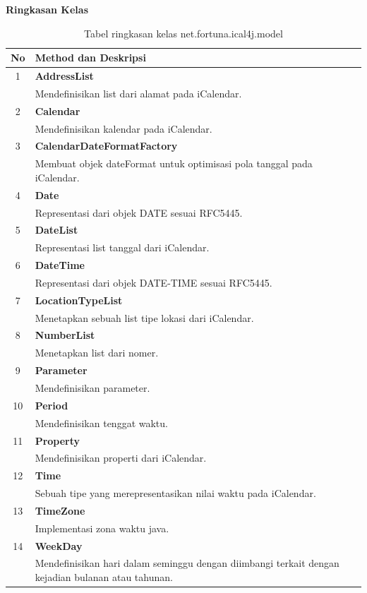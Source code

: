 	\noindent \textbf{Ringkasan Kelas}\cite{ical}
	\begin{table}[H]
		\centering
		\caption{Tabel ringkasan kelas net.fortuna.ical4j.model}
		\label{tab:kelas_net.fortuna.ical4j.model}
	\begin{tabular}{|c|p{12cm}|}
		\hline
		\textbf{No} & \textbf{Method dan Deskripsi} \\ \hline \hline
		1 & \textbf{AddressList}\\
			&	Mendefinisikan list dari alamat pada iCalendar.\\ \hline
		2 & \textbf{Calendar}\\
			&	Mendefinisikan kalendar pada iCalendar. \\ \hline
		3 & \textbf{CalendarDateFormatFactory}\\
			&	Membuat objek dateFormat untuk optimisasi pola tanggal pada iCalendar.\\ \hline
		4 & \textbf{Date}\\
			&	Representasi dari objek DATE sesuai RFC5445.\\ \hline
		5 & \textbf{DateList}\\
			&	Representasi list tanggal dari iCalendar.\\ \hline
		6 & \textbf{DateTime}\\
			&	Representasi dari objek DATE-TIME sesuai RFC5445.\\ \hline
		7 & \textbf{LocationTypeList}\\
			&	Menetapkan sebuah list tipe lokasi dari iCalendar.\\ \hline
		8 & \textbf{NumberList}\\
			&	Menetapkan list dari nomer.\\ \hline
		9 & \textbf{Parameter}\\
			&	Mendefinisikan parameter.\\ \hline
		10 & \textbf{Period}\\
			&	Mendefinisikan tenggat waktu.\\ \hline
		11 & \textbf{Property}\\
			&	Mendefinisikan properti dari iCalendar.\\ \hline		12 & \textbf{Time}\\
			&	Sebuah tipe yang merepresentasikan nilai waktu pada iCalendar.\\ \hline
		13 & \textbf{TimeZone}\\
			&	Implementasi zona waktu java.\\ \hline
		14 & \textbf{WeekDay}\\
			&	Mendefinisikan hari dalam seminggu dengan diimbangi terkait dengan kejadian bulanan atau tahunan.\\ \hline	
	\end{tabular}
\end{table}
	
